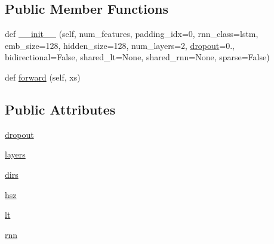 \subsection*{Public Member Functions}
\begin{DoxyCompactItemize}
\item 
def \hyperlink{classparlai_1_1agents_1_1legacy__agents_1_1seq2seq_1_1modules__v0_1_1Encoder_a154b3230fa137794b1839db9642360ba}{\+\_\+\+\_\+init\+\_\+\+\_\+} (self, num\+\_\+features, padding\+\_\+idx=0, rnn\+\_\+class=\textquotesingle{}lstm\textquotesingle{}, emb\+\_\+size=128, hidden\+\_\+size=128, num\+\_\+layers=2, \hyperlink{classparlai_1_1agents_1_1legacy__agents_1_1seq2seq_1_1modules__v0_1_1Encoder_a163f618759e34a79a088ee707078f007}{dropout}=0., bidirectional=False, shared\+\_\+lt=None, shared\+\_\+rnn=None, sparse=False)
\item 
def \hyperlink{classparlai_1_1agents_1_1legacy__agents_1_1seq2seq_1_1modules__v0_1_1Encoder_a53c7f1b88916692c14fa744077b3bd77}{forward} (self, xs)
\end{DoxyCompactItemize}
\subsection*{Public Attributes}
\begin{DoxyCompactItemize}
\item 
\hyperlink{classparlai_1_1agents_1_1legacy__agents_1_1seq2seq_1_1modules__v0_1_1Encoder_a163f618759e34a79a088ee707078f007}{dropout}
\item 
\hyperlink{classparlai_1_1agents_1_1legacy__agents_1_1seq2seq_1_1modules__v0_1_1Encoder_ade7bafa8cbfe35093ebb2813fad9b8e9}{layers}
\item 
\hyperlink{classparlai_1_1agents_1_1legacy__agents_1_1seq2seq_1_1modules__v0_1_1Encoder_a35141680cd7a71fbf61f60ce2d515a4c}{dirs}
\item 
\hyperlink{classparlai_1_1agents_1_1legacy__agents_1_1seq2seq_1_1modules__v0_1_1Encoder_ad23bedb1c44da264f0916883a9458a61}{hsz}
\item 
\hyperlink{classparlai_1_1agents_1_1legacy__agents_1_1seq2seq_1_1modules__v0_1_1Encoder_a69293e2d89c3b6fc6ccfffaa80fb651b}{lt}
\item 
\hyperlink{classparlai_1_1agents_1_1legacy__agents_1_1seq2seq_1_1modules__v0_1_1Encoder_adced0493c6365cc7c123b848858f047d}{rnn}
\end{DoxyCompactItemize}


